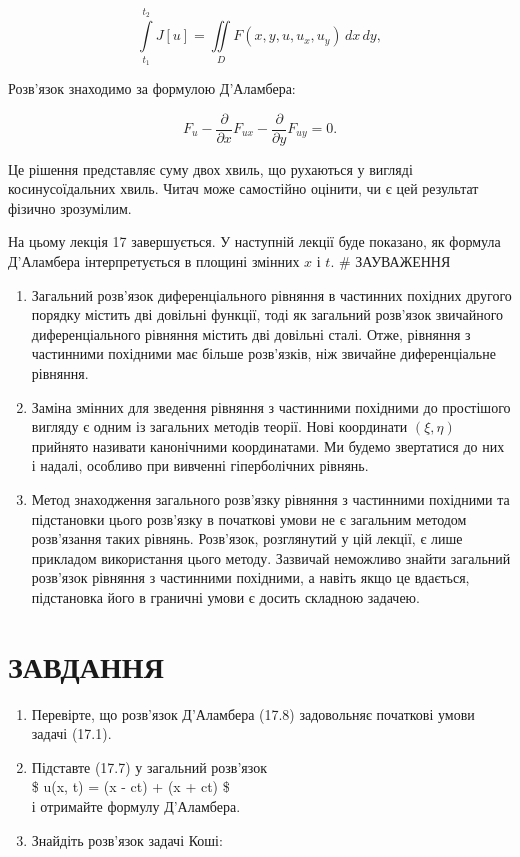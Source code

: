 \[
\int\limits_{t_1}^{t_2} J[u] = \iint\limits_D F(x, y, u, u_x, u_y)\,dx\,dy,
\]

Розв'язок знаходимо за формулою Д'Аламбера:

\[
F_u - \frac{\partial}{\partial x}F_{ux} - \frac{\partial}{\partial y}F_{uy} = 0.
\]

Це рішення представляє суму двох хвиль, що рухаються у вигляді косинусоїдальних хвиль. Читач може самостійно оцінити, чи є цей результат фізично зрозумілим.

На цьому лекція 17 завершується. У наступній лекції буде показано, як формула Д'Аламбера інтерпретується в площині змінних \(x\) і \(t\). \# ЗАУВАЖЕННЯ

\begin{enumerate}
\def\labelenumi{\arabic{enumi}.}
\item
  Загальний розв'язок диференціального рівняння в частинних похідних другого порядку містить дві довільні функції, тоді як загальний розв'язок звичайного диференціального рівняння містить дві довільні сталі. Отже, рівняння з частинними похідними має більше розв'язків, ніж звичайне диференціальне рівняння.
\item
  Заміна змінних для зведення рівняння з частинними похідними до простішого вигляду є одним із загальних методів теорії. Нові координати \((\xi, \eta)\) прийнято називати канонічними координатами. Ми будемо звертатися до них і надалі, особливо при вивченні гіперболічних рівнянь.
\item
  Метод знаходження загального розв'язку рівняння з частинними похідними та підстановки цього розв'язку в початкові умови не є загальним методом розв'язання таких рівнянь. Розв'язок, розглянутий у цій лекції, є лише прикладом використання цього методу. Зазвичай неможливо знайти загальний розв'язок рівняння з частинними похідними, а навіть якщо це вдається, підстановка його в граничні умови є досить складною задачею.
\end{enumerate}

\section{ЗАВДАННЯ}\label{ux437ux430ux432ux434ux430ux43dux43dux44f-12}

\begin{enumerate}
\def\labelenumi{\arabic{enumi}.}
\item
  Перевірте, що розв'язок Д'Аламбера (17.8) задовольняє початкові умови задачі (17.1).
\item
  Підставте (17.7) у загальний розв'язок\\
  \$ u(x, t) = \psi(x - ct) + \psi(x + ct) \$\\
  і отримайте формулу Д'Аламбера.
\item
  Знайдіть розв'язок задачі Коші:
\end{enumerate}

